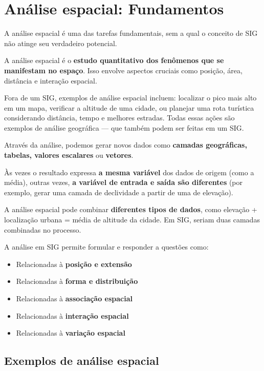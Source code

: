 \chapter{Análise espacial: Fundamentos}

\pagestyle{fancy}

A análise espacial é uma das tarefas fundamentais, sem a qual o conceito de SIG não atinge seu verdadeiro potencial.

A análise espacial é o \textbf{estudo quantitativo dos fenômenos que se manifestam no espaço}. Isso envolve aspectos cruciais como posição, área, distância e interação espacial.

Fora de um SIG, exemplos de análise espacial incluem: localizar o pico mais alto em um mapa, verificar a altitude de uma cidade, ou planejar uma rota turística considerando distância, tempo e melhores estradas. Todas essas ações são exemplos de análise geográfica — que também podem ser feitas em um SIG.

Através da análise, podemos gerar novos dados como \textbf{camadas geográficas, tabelas, valores escalares} ou \textbf{vetores}.

Às vezes o resultado expressa \textbf{a mesma variável} dos dados de origem (como a média), outras vezes, \textbf{a variável de entrada e saída são diferentes} (por exemplo, gerar uma camada de declividade a partir de uma de elevação).

A análise espacial pode combinar \textbf{diferentes tipos de dados}, como elevação + localização urbana = média de altitude da cidade. Em SIG, seriam duas camadas combinadas no processo.

A análise em SIG permite formular e responder a questões como:

\begin{itemize}
 \item Relacionadas à \textbf{posição e extensão}
 \item Relacionadas à \textbf{forma e distribuição}
 \item Relacionadas à \textbf{associação espacial}
 \item Relacionadas à \textbf{interação espacial}
 \item Relacionadas à \textbf{variação espacial}
\end{itemize}

\section{Exemplos de análise espacial}


